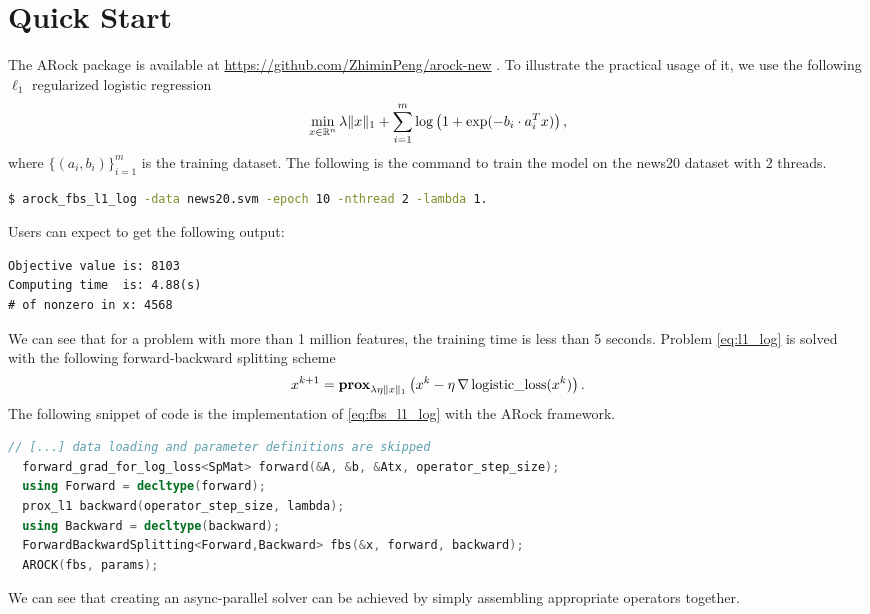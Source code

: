 \section{Quick Start}
The ARock package is available at \url{https://github.com/ZhiminPeng/arock-new} . To illustrate the practical usage of it, we use the following $\ell_1$ regularized logistic regression
\begin{equation}\label{eq:l1_log}
\min_{x \in \mathbb{R}^n} \lambda \|x\|_1 + \sum_{i = 1}^m \log\left(1 + \exp(-b_i \cdot a_i^T x)\right),
\end{equation}
where $\{(a_i, b_i)\}_{i = 1}^m$ is the training dataset. The following is the command to train the model on the news20 dataset with 2 threads. 
\begin{lstlisting}[language=bash]
$ arock_fbs_l1_log -data news20.svm -epoch 10 -nthread 2 -lambda 1.
\end{lstlisting}
Users can expect to get the following output:
\begin{lstlisting}[language={}]
Objective value is: 8103
Computing time  is: 4.88(s)
# of nonzero in x: 4568
\end{lstlisting}
We can see that for a problem with more than 1 million features, the training time is less than 5 seconds. Problem \eqref{eq:l1_log} is solved with the following forward-backward splitting scheme
\begin{equation}\label{eq:fbs_l1_log}
x^{k+1} = \mathbf{prox}_{\lambda \eta \|x\|_1} \left(x^k - \eta \, \nabla \,\text{logistic\_loss}(x^k)\right).
\end{equation}
The following snippet of code is the implementation of \eqref{eq:fbs_l1_log} with the ARock framework. 
\begin{lstlisting}[language=C++]
  // [...] data loading and parameter definitions are skipped
  forward_grad_for_log_loss<SpMat> forward(&A, &b, &Atx, operator_step_size);
  using Forward = decltype(forward);
  prox_l1 backward(operator_step_size, lambda);
  using Backward = decltype(backward);
  ForwardBackwardSplitting<Forward,Backward> fbs(&x, forward, backward);  
  AROCK(fbs, params);  
\end{lstlisting}
We can see that creating an async-parallel solver can be achieved by simply assembling appropriate operators together. 
